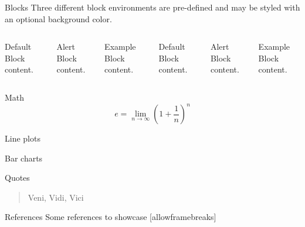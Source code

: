 \documentclass[12pt]{beamer}
\begin{document}
\begin{frame}{Blocks}
  Three different block environments are pre-defined and may be styled with an
  optional background color.

  \begin{columns}[T,onlytextwidth]
      \begin{block}{Default}
        Block content.
      \end{block}

      \begin{alertblock}{Alert}
        Block content.
      \end{alertblock}

      \begin{exampleblock}{Example}
        Block content.
      \end{exampleblock}



      \begin{block}{Default}
        Block content.
      \end{block}

      \begin{alertblock}{Alert}
        Block content.
      \end{alertblock}

      \begin{exampleblock}{Example}
        Block content.
      \end{exampleblock}

  \end{columns}
\end{frame}
\begin{frame}{Math}
  \begin{equation*}
    e = \lim_{n\to \infty} \left(1 + \frac{1}{n}\right)^n
  \end{equation*}
\end{frame}
\begin{frame}{Line plots}
\end{frame}
\begin{frame}{Bar charts}
\end{frame}
\begin{frame}{Quotes}
  \begin{quote}
    Veni, Vidi, Vici
  \end{quote}
\end{frame}

\begin{frame}{References}
  Some references to showcase [allowframebreaks] \cite{knuth92,ConcreteMath,Simpson,Er01,greenwade93}
\end{frame}
\end{document}
